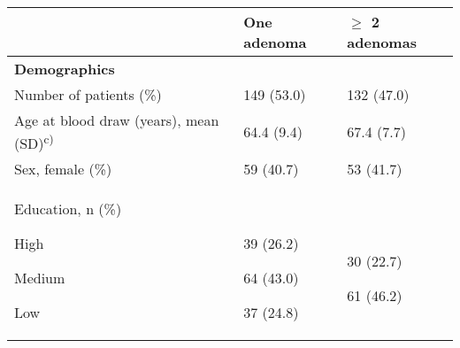 \begin{flushleft}
\small
{}
\label{table5_1}
\tablehead{}
\begin{supertabular}{m{5.5cm}m{3.5cm}m{3cm}}
\hline
~
 &
\bfseries\color{black} One adenoma &
\bfseries\color{black} ${\geq}$ 2
adenomas\\\hline
\bfseries Demographics &
~
 &
~
\\\hline
 Number of patients (\%) &
 149 (53.0) &
 132 (47.0)\\\hline
 Age at blood draw (years), mean
(SD)\textsuperscript{c)} &
 64.4 (9.4) &
 67.4 (7.7)\\\hline
 Sex, female (\%) &
 59 (40.7) &
 53 (41.7)\\\hline
{ Education, n (\%)}

{ High}

{ Medium}

 Low &
~

{ 39 (26.2)}

{ 64 (43.0)}

 37 (24.8) &
~

{ 30 (22.7)}

{ 61 (46.2)}


\end{supertabular}
\end{flushleft}

